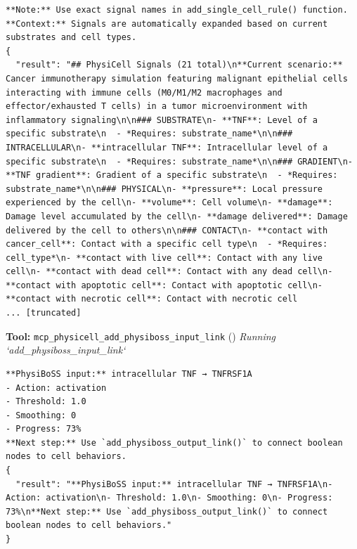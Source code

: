 \documentclass[11pt,a4paper]{article}
\begin{document}
\begin{toolokbox}
\begin{lstlisting}
**Note:** Use exact signal names in add_single_cell_rule() function.
**Context:** Signals are automatically expanded based on current substrates and cell types.
{
  "result": "## PhysiCell Signals (21 total)\n**Current scenario:** Cancer immunotherapy simulation featuring malignant epithelial cells interacting with immune cells (M0/M1/M2 macrophages and effector/exhausted T cells) in a tumor microenvironment with inflammatory signaling\n\n### SUBSTRATE\n- **TNF**: Level of a specific substrate\n  - *Requires: substrate_name*\n\n### INTRACELLULAR\n- **intracellular TNF**: Intracellular level of a specific substrate\n  - *Requires: substrate_name*\n\n### GRADIENT\n- **TNF gradient**: Gradient of a specific substrate\n  - *Requires: substrate_name*\n\n### PHYSICAL\n- **pressure**: Local pressure experienced by the cell\n- **volume**: Cell volume\n- **damage**: Damage level accumulated by the cell\n- **damage delivered**: Damage delivered by the cell to others\n\n### CONTACT\n- **contact with cancer_cell**: Contact with a specific cell type\n  - *Requires: cell_type*\n- **contact with live cell**: Contact with any live cell\n- **contact with dead cell**: Contact with any dead cell\n- **contact with apoptotic cell**: Contact with apoptotic cell\n- **contact with necrotic cell**: Contact with necrotic cell
... [truncated]
\end{lstlisting}
\end{toolokbox}
\begin{toolokbox}
\textbf{Tool:} \texttt{mcp\_physicell\_add\_physiboss\_input\_link} (\checkmark)
\textit{Running `add\_physiboss\_input\_link`}
\begin{lstlisting}
**PhysiBoSS input:** intracellular TNF → TNFRSF1A
- Action: activation
- Threshold: 1.0
- Smoothing: 0
- Progress: 73%
**Next step:** Use `add_physiboss_output_link()` to connect boolean nodes to cell behaviors.
{
  "result": "**PhysiBoSS input:** intracellular TNF → TNFRSF1A\n- Action: activation\n- Threshold: 1.0\n- Smoothing: 0\n- Progress: 73%\n**Next step:** Use `add_physiboss_output_link()` to connect boolean nodes to cell behaviors."
}
\end{lstlisting}
\end{toolokbox}
\end{document}
